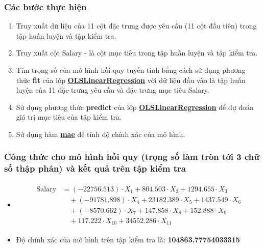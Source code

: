 \documentclass{report}
\begin{document}
        \subsubsection{Các bước thực hiện}
            \begin{enumerate}
                \item Truy xuất dữ liệu của 11 cột đặc trưng được yêu cầu (11 cột đầu tiên) trong tập huấn luyện và tập kiểm tra.
                \item Truy xuất cột Salary - là cột mục tiêu trong tập huấn luyện và tập kiểm tra.
                \item Tìm trọng số của mô hình hồi quy tuyến tính bằng cách sử dụng phương thức \textbf{fit} của lớp \hyperref[sec:olslinearregression]{\textbf{OLSLinearRegression}} với dữ liệu đầu vào là tập huấn luyện của 11 đặc trưng yêu cầu và đặc trưng mục tiêu Salary.
                \item Sử dụng phương thức \textbf{predict} của lớp \hyperref[sec:olslinearregression]{\textbf{OLSLinearRegression}} để dự đoán giá trị mục tiêu của tập kiểm tra.
                \item Sử dụng hàm \hyperref[sec:mae]{\textbf{mae}}  để tính độ chính xác của mô hình.
            \end{enumerate}

        \subsubsection{Công thức cho mô hình hồi quy (trọng số làm tròn tới 3 chữ số thập phân) và kết quả trên tập kiểm tra}
            \begin{itemize}
                \item     
                    \begin{align}
                        \begin{split}
                            \text{Salary} &= (-22756.513) \cdot X_1 + 804.503 \cdot X_2 + 1294.655 \cdot X_3 \\
                            &\quad + (-91781.898) \cdot X_4 + 23182.389 \cdot X_5 + 1437.549 \cdot X_6 \\
                            &\quad + (-8570.662) \cdot X_7 + 147.858 \cdot X_8 + 152.888 \cdot X_9 \\
                            &\quad + 117.222 \cdot X_{10} + 34552.286 \cdot X_{11}
                        \end{split}
                    \end{align}
                \item Độ chính xác của mô hình trên tập kiểm tra là: \textbf{104863.77754033315}
            \end{itemize}
\end{document}
